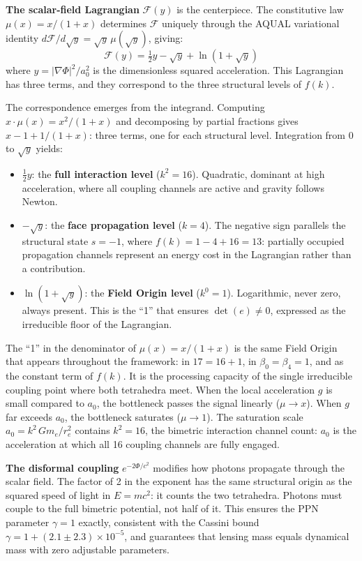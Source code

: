 \documentclass[aps,prd,preprint,superscriptaddress,showpacs,preprintnumbers,amsmath,amssymb,nofootinbib]{revtex4-2}
\begin{document}
\textbf{The scalar-field Lagrangian} $\mathcal{F}(y)$ is the centerpiece. The constitutive law $\mu(x) = x/(1+x)$ determines $\mathcal{F}$ uniquely through the AQUAL variational identity $d\mathcal{F}/d\sqrt{y} = \sqrt{y}\,\mu(\sqrt{y})$, giving:
\begin{equation}
\mathcal{F}(y) = \tfrac{1}{2}y - \sqrt{y} + \ln(1 + \sqrt{y})
\label{eq:aqual-lagrangian}
\end{equation}
where $y = |\nabla\Phi|^2/a_0^2$ is the dimensionless squared acceleration. This Lagrangian has three terms, and they correspond to the three structural levels of $f(k)$.

The correspondence emerges from the integrand. Computing $x \cdot \mu(x) = x^2/(1+x)$ and decomposing by partial fractions gives $x - 1 + 1/(1+x)$: three terms, one for each structural level. Integration from $0$ to $\sqrt{y}$ yields:
\begin{itemize}
\item $\tfrac{1}{2}y$: the \textbf{full interaction level} ($k^2 = 16$). Quadratic, dominant at high acceleration, where all coupling channels are active and gravity follows Newton.
\item $-\sqrt{y}$: the \textbf{face propagation level} ($k = 4$). The negative sign parallels the structural state $s = -1$, where $f(k) = 1 - 4 + 16 = 13$: partially occupied propagation channels represent an energy cost in the Lagrangian rather than a contribution.
\item $\ln(1 + \sqrt{y})$: the \textbf{Field Origin level} ($k^0 = 1$). Logarithmic, never zero, always present. This is the ``1'' that ensures $\det(e) \neq 0$, expressed as the irreducible floor of the Lagrangian.
\end{itemize}

The ``1'' in the denominator of $\mu(x) = x/(1+x)$ is the same Field Origin that appears throughout the framework: in $17 = 16 + 1$, in $\beta_0 = \beta_4 = 1$, and as the constant term of $f(k)$. It is the processing capacity of the single irreducible coupling point where both tetrahedra meet. When the local acceleration $g$ is small compared to $a_0$, the bottleneck passes the signal linearly ($\mu \to x$). When $g$ far exceeds $a_0$, the bottleneck saturates ($\mu \to 1$). The saturation scale $a_0 = k^2\,Gm_e/r_e^2$ contains $k^2 = 16$, the bimetric interaction channel count: $a_0$ is the acceleration at which all 16 coupling channels are fully engaged.

\textbf{The disformal coupling} $e^{-2\Phi/c^2}$ modifies how photons propagate through the scalar field. The factor of 2 in the exponent has the same structural origin as the squared speed of light in $E = mc^2$: it counts the two tetrahedra. Photons must couple to the full bimetric potential, not half of it. This ensures the PPN parameter $\gamma = 1$ exactly, consistent with the Cassini bound $\gamma = 1 + (2.1 \pm 2.3) \times 10^{-5}$, and guarantees that lensing mass equals dynamical mass with zero adjustable parameters.
\end{document}
